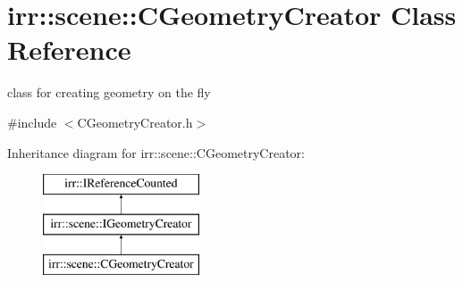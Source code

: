 \hypertarget{classirr_1_1scene_1_1CGeometryCreator}{}\section{irr\+:\+:scene\+:\+:C\+Geometry\+Creator Class Reference}
\label{classirr_1_1scene_1_1CGeometryCreator}


class for creating geometry on the fly  




{\ttfamily \#include $<$C\+Geometry\+Creator.\+h$>$}

Inheritance diagram for irr\+:\+:scene\+:\+:C\+Geometry\+Creator\+:\begin{figure}[H]
\begin{center}
\leavevmode
\includegraphics[height=3.000000cm]{classirr_1_1scene_1_1CGeometryCreator}
\end{center}
\end{figure}
